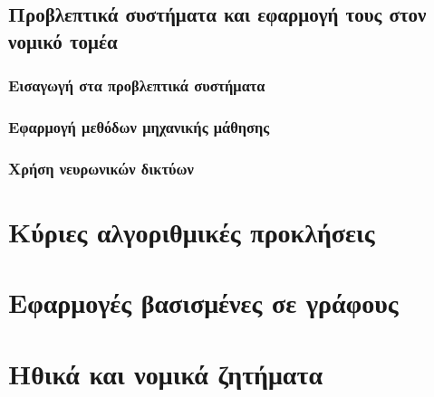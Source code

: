 \documentclass{article}
\begin{document}
\subsection{Προβλεπτικά συστήματα και εφαρμογή τους στον νομικό τομέα}

\subsubsection{Εισαγωγή στα προβλεπτικά συστήματα}

\subsubsection{Εφαρμογή μεθόδων μηχανικής μάθησης}

\subsubsection{Χρήση νευρωνικών δικτύων}

\section{Κύριες αλγοριθμικές προκλήσεις}

\subsubsection{}


\subsubsection{}


\section{Εφαρμογές βασισμένες σε γράφους}

\subsubsection{}


\subsubsection{}


\section{Ηθικά και νομικά ζητήματα}
\end{document}

